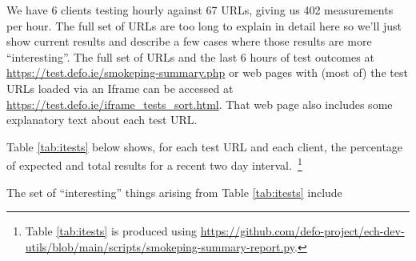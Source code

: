 We have 6 clients testing hourly against 67 URLs, giving us 402 measurements
per hour. The full set of URLs are too long to explain in detail here so
we'll just show current results and describe a few cases where those results
are more ``interesting''. The full set of URLs and the last 6 hours of test
outcomes at \url{https://test.defo.ie/smokeping-summary.php} or 
web pages with (most of) the test URLs loaded via an Iframe can be accessed at
\url{https://test.defo.ie/iframe_tests_sort.html}. That web page also includes
some explanatory text about each test URL.

Table \ref{tab:itests} below shows, for each test URL and each client,
the percentage of expected and total results for a recent two day
interval.~\footnote{Table \ref{tab:itests} is produced
using \url{https://github.com/defo-project/ech-dev-utils/blob/main/scripts/smokeping-summary-report.py}.}




The set of ``interesting'' things arising from Table \ref{tab:itests} include


